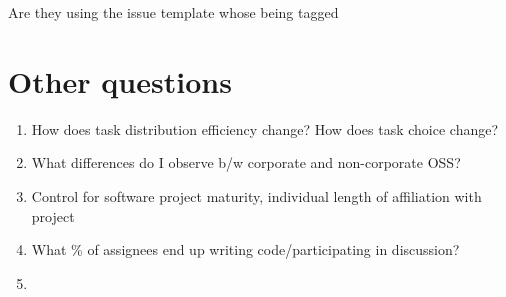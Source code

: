 \documentclass[source/paper/main.tex]{subfiles}
\begin{document}
Are they using the issue template
whose being tagged


\section{Other questions}
\begin{enumerate}
    \item How does task distribution efficiency change? How does task choice change?
    \item What differences do I observe b/w corporate and non-corporate OSS?
    \item Control for software project maturity, individual length of affiliation with project
    \item What \% of assignees end up writing code/participating in discussion?
    \item 
\end{enumerate}
\end{document}
